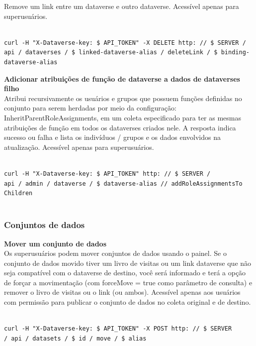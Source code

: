 \documentclass[12pt,hidelinks]{article}
\begin{document}
Remove um link entre um dataverse e outro dataverse. Acessível apenas para \\superusuários.

\begin{verbatim}

curl -H "X-Dataverse-key: $ API_TOKEN" -X DELETE http: // $ SERVER / 
api / dataverses / $ linked-dataverse-alias / deleteLink / $ binding-
dataverse-alias

\end{verbatim}
 
\textbf{Adicionar atribuições de função de dataverse a dados de dataverses filho}\\

Atribui recursivamente os usuários e grupos que possuem funções definidas no conjunto para serem herdadas por meio da configuração: InheritParentRoleAssignments, em um coleta especificado para ter as mesmas atribuições de função em todos os dataverses criados nele. A resposta indica sucesso ou falha e lista os indivíduos / grupos e os dados envolvidos na atualização. Acessível apenas para superusuários.

\begin{verbatim}

curl -H "X-Dataverse-key: $ API_TOKEN" http: // $ SERVER / 
api / admin / dataverse / $ dataverse-alias // addRoleAssignmentsTo
Children
 
 \end{verbatim}
 
\subsubsection{Conjuntos de dados}

\qquad\textbf{Mover um conjunto de dados}\\

Os superusuários podem mover conjuntos de dados usando o painel. Se o conjunto de dados movido tiver um livro de visitas ou um link dataverse que não seja compatível com o dataverse de destino, você será informado e terá a opção de forçar a movimentação (com forceMove = true como parâmetro de consulta) e remover o livro de visitas ou o link (ou ambos). Acessível apenas aos usuários com permissão para publicar o conjunto de dados no coleta original e de destino.

\begin{verbatim}

curl -H "X-Dataverse-key: $ API_TOKEN" -X POST http: // $ SERVER 
/ api / datasets / $ id / move / $ alias
 
\end{verbatim}
\end{document}
